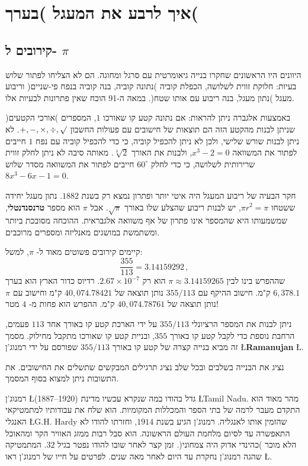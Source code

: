 

\chapter{איך לרבע את המעגל )בערך(}\label{c.square-a-circle}


\section{%
קירובים ל-%
$\pi$}

היוונים היו הראשונים שחקרו בנייה גיאומרטית עם סרגל ומחוגה. הם לא הצליחו לפתור שלוש בעיות: חלוקת זווית לשלושה, הכפלת קוביה )נתונה קוביה, בנה קוביה בנפח פי-שניים( וריבוע מעגל )נתון מעגל, בנה ריבוע עם אותו שטח(. במאה ה-91 הוכח שאין פתרונות לבעיות אלו.

באמצעות אלגברה ניתן להראות: אם נתונה קטע קו שאורכו
$1$,
המספרים )אורכי הקטעים( שניתן לבנות מהקטע הזה הם תוצאות של חישובים עם פעולות החשבון
$+,-,\times,\div,\surd$.
לא ניתן לבנות שורש שלישי, ולכן לא ניתן להכפיל קוביה, כי כדי להכפיל קוביה עם נפח 
$1$
חייבים לפתור את המשוואה
$x^3-2=0$,
ולבנות את האורך
$\sqrt[3]{2}$.
מאותה סיבה לא ניתן לחלק זווית שרירותית לשלושה, כי כדי לחלק 
$60^\circ$
חייבים לפתור את המשוואה מסדר שלוש
$8x^3-6x-1=0$.

חקר הבעיה של ריבוע המעגל היה איטי יותר ופתרון נמצא רק בשנת
$1882$.
נתון מעגל יחידה ששטחו
$\pi r^2=\pi$,
יש לבנות ריבוע שהצלע שלו באורך
$\sqrt{\pi}$.
אבל
$\pi$
הוא מספר
\textbf{טרנסנדנטלי},
שמשמעותו היא שהמספר אינו פתרון של אף משוואה אלגבראית. ההוכחה מסובכת ביותר ומשתמשת במושגים מאנליזה ומספרים מרוכבים.

קיימים קירובים פשוטים מאוד ל-%
$\pi$,
למשל:
\[
\frac{355}{113}=3.14159292\,,
\]
שההפרש בינו לבין
$\pi\approx 3.14159265$
הוא רק 
$2.67\times 10^{-7}$.
רדיוס כדור הארץ הוא בערך
$6,378.1$
ק"מ. חישוב ההיקף עם
$355/113$
נותן תוצאה של
$40,074.78421$
ק"מ וחישוב עם
$\pi$
נותן תוצאה של
$40,074.78761$
ק"מ. ההפרש הוא פחות מ-%
$4$
מטר!

ניתן לבנות את המספר הרציונלי
$355/113$
על ידי הארכת קטע קו באורך אחד
$113$
פעמים,
הרחבת נוספת כדי לקבל קטע קו באורך 
$355$,
ובניית קטע קו שאורכו מתקבל מחילוק. מסמך זה מביא בנייה קצרה של קטע קו באורך
$355/113$
שפורסם על ידי רמנוג'ן
\L{\textbf{Ramanujan}}
\L{\cite{ramanujan}}.

נציג את הבנייה בשלבים ובכל שלב נציג תרגילים המבקשים שתשלים את החישובים. את התשובות ניתן למצוא בסוף המסמך.

רמנוג'ן
\L{(1887--1920)}
גדל בהודו במה שנקרא עכשיו מדינת
\L{Tamil Nadu}.
מהר מאוד הוא התקדם מעבר לרמה של בתי הספר והמכללות המקומיות. הוא שלח את עבודותיו למתמטיקאי האנגלי
\L{G.H. Hardy}
שהזמין אותו לאנגליה. רמנוג'ן הגיע בשנת
$1914$,
וחזרתו להודו לא התאפשרה עד לסיום מלחמת העולם הראשונה. הוא סבל רבות ממזג האוויר הקר ומהאוכל הלא מוכר )כהינדי אדוק היה צמחוני(. זמן קצר לאחר שובו להודו נפטר בגיל 
$32$.
המתמטיקה שהגה רמנוג'ן נחקרת עד היום לאחר מאה שנים. לפרטים על חייו של רמנוג'ן ראו
\L{\cite{kanigel}}.



